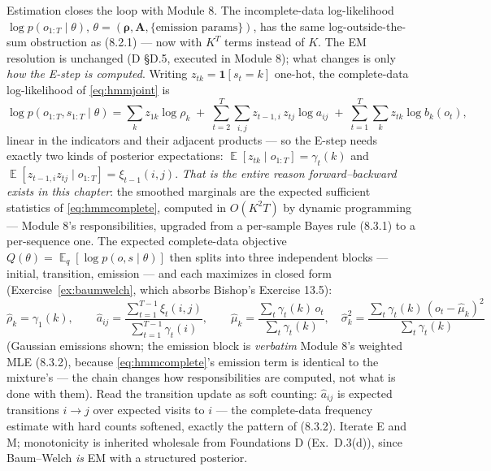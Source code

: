 \documentclass[11pt]{article}
\numberwithin{equation}{section}
\theoremstyle{plain}
\theoremstyle{definition}
\theoremstyle{remark}
\DeclareMathOperator{\E}{\mathbb{E}}
\newcommand{\bA}{\bm{A}}
\newcommand{\brho}{\bm{\rho}}
\newcommand{\resp}{\gamma}
\begin{document}
Estimation closes the loop with Module 8. The incomplete-data log-likelihood $\log p(o_{1:T} \mid \theta)$, $\theta = (\brho, \bA, \{\text{emission params}\})$, has the same log-outside-the-sum obstruction as (8.2.1) --- now with $K^T$ terms instead of $K$. The EM resolution is unchanged (D \S D.5, executed in Module 8); what changes is only \emph{how the E-step is computed}. Writing $z_{tk} = \mathbf{1}[s_t = k]$ one-hot, the complete-data log-likelihood of \eqref{eq:hmmjoint} is
\begin{equation}
\log p(o_{1:T}, s_{1:T} \mid \theta)
= \sum_k z_{1k} \log \rho_k
\;+\; \sum_{t=2}^{T} \sum_{i,j} z_{t-1,i}\, z_{tj} \log a_{ij}
\;+\; \sum_{t=1}^{T} \sum_k z_{tk} \log b_k(o_t),
\label{eq:hmmcomplete}
\end{equation}
linear in the indicators and their adjacent products --- so the E-step needs exactly two kinds of posterior expectations: $\E[z_{tk} \mid o_{1:T}] = \resp_t(k)$ and $\E[z_{t-1,i} z_{tj} \mid o_{1:T}] = \xi_{t-1}(i,j)$. \emph{That is the entire reason forward--backward exists in this chapter}: the smoothed marginals are the expected sufficient statistics of \eqref{eq:hmmcomplete}, computed in $O(K^2T)$ by dynamic programming --- Module 8's responsibilities, upgraded from a per-sample Bayes rule (8.3.1) to a per-sequence one. The expected complete-data objective $Q(\theta) = \E_q[\log p(o, s \mid \theta)]$ then splits into three independent blocks --- initial, transition, emission --- and each maximizes in closed form (Exercise~\ref{ex:baumwelch}, which absorbs Bishop's Exercise 13.5):
\begin{equation}
\hat\rho_k = \resp_1(k),
\qquad
\hat a_{ij} = \frac{\sum_{t=1}^{T-1} \xi_t(i,j)}{\sum_{t=1}^{T-1} \resp_t(i)},
\qquad
\hat\mu_k = \frac{\sum_t \resp_t(k)\, o_t}{\sum_t \resp_t(k)},
\quad
\hat\sigma_k^2 = \frac{\sum_t \resp_t(k)\, (o_t - \hat\mu_k)^2}{\sum_t \resp_t(k)}
\label{eq:bwmstep}
\end{equation}
(Gaussian emissions shown; the emission block is \emph{verbatim} Module 8's weighted MLE (8.3.2), because \eqref{eq:hmmcomplete}'s emission term is identical to the mixture's --- the chain changes how responsibilities are computed, not what is done with them). Read the transition update as soft counting: $\hat a_{ij}$ is expected transitions $i \to j$ over expected visits to $i$ --- the complete-data frequency estimate with hard counts softened, exactly the pattern of (8.3.2). Iterate E and M; monotonicity is inherited wholesale from Foundations D (Ex.\ D.3(d)), since Baum--Welch \emph{is} EM with a structured posterior.
\end{document}
